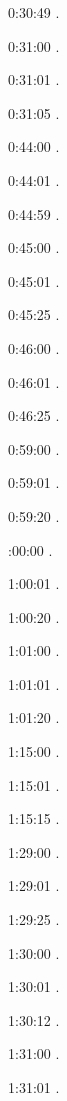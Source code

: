 \documentclass[italian]{article}
\begin{document}
0:30:49   .

0:31:00   .

0:31:01   .

0:31:05   .

0:44:00   .

0:44:01   .

0:44:59   .

0:45:00   .

0:45:01   .

0:45:25   .

0:46:00   .

0:46:01   .

0:46:25   .

0:59:00   .

0:59:01   .

0:59:20   .

:00:00  .

1:00:01   . 

1:00:20  .

1:01:00   . 

1:01:01  .

1:01:20   . 

1:15:00   . 

1:15:01   . 

1:15:15   . 

1:29:00   . 

1:29:01   . 

1:29:25   . 

1:30:00   .

1:30:01   .

1:30:12   .

1:31:00   .

1:31:01   .
\end{document}

